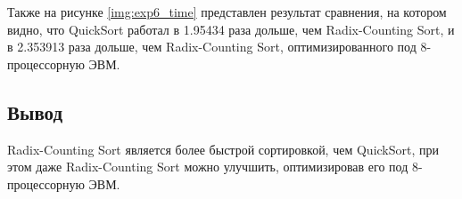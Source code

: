 %

Также на рисунке \ref{img:exp6_time} представлен результат сравнения, на котором видно, что QuickSort работал в 1.95434 раза дольше, чем Radix-Counting Sort, и в 2.353913 раза дольше, чем Radix-Counting Sort, оптимизированного под 8-процессорную ЭВМ.


\clearpage



\subsection{Вывод}

Radix-Counting Sort является более быстрой сортировкой, чем QuickSort, при этом даже Radix-Counting Sort можно улучшить, оптимизировав его под 8-процессорную ЭВМ.
